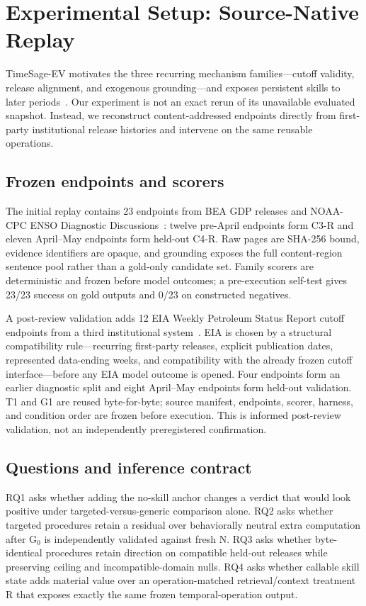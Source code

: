 \section{Experimental Setup: Source-Native Replay}
\label{sec:evidence}
TimeSage-EV motivates the three recurring mechanism families---cutoff validity, release alignment, and exogenous grounding---and exposes persistent skills to later periods~\citep{yao2026timesage}. Our experiment is not an exact rerun of its unavailable evaluated snapshot. Instead, we reconstruct content-addressed endpoints directly from first-party institutional release histories and intervene on the same reusable operations.

\subsection{Frozen endpoints and scorers}
The initial replay contains 23 endpoints from BEA GDP releases and NOAA-CPC ENSO Diagnostic Discussions~\citep{bea2026archive,noaa2026enso}: twelve pre-April endpoints form C3-R and eleven April--May endpoints form held-out C4-R. Raw pages are SHA-256 bound, evidence identifiers are opaque, and grounding exposes the full content-region sentence pool rather than a gold-only candidate set. Family scorers are deterministic and frozen before model outcomes; a pre-execution self-test gives 23/23 success on gold outputs and 0/23 on constructed negatives.

A post-review validation adds 12 EIA Weekly Petroleum Status Report cutoff endpoints from a third institutional system~\citep{eia2026wpsrarchive}. EIA is chosen by a structural compatibility rule---recurring first-party releases, explicit publication dates, represented data-ending weeks, and compatibility with the already frozen cutoff interface---before any EIA model outcome is opened. Four endpoints form an earlier diagnostic split and eight April--May endpoints form held-out validation. T1 and G1 are reused byte-for-byte; source manifest, endpoints, scorer, harness, and condition order are frozen before execution. This is informed post-review validation, not an independently preregistered confirmation.

\subsection{Questions and inference contract}
RQ1 asks whether adding the no-skill anchor changes a verdict that would look positive under targeted-versus-generic comparison alone. RQ2 asks whether targeted procedures retain a residual over behaviorally neutral extra computation after G$_0$ is independently validated against fresh N. RQ3 asks whether byte-identical procedures retain direction on compatible held-out releases while preserving ceiling and incompatible-domain nulls. RQ4 asks whether callable skill state adds material value over an operation-matched retrieval/context treatment R that exposes exactly the same frozen temporal-operation output.

